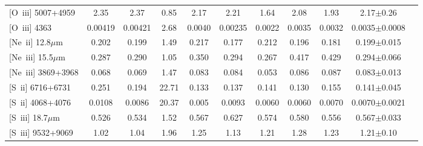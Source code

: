 \documentclass[twocolumn]{aastex62}
\begin{document}
\begin{CJK*}{UTF8}{gbsn}
\begin{table*}
\begin{center}
\begin{minipage}{13.5cm}
\begin{tabular}{@{}lcccccccccc}
{[O~\sc iii]} 5007+4959           & 2.35     & 2.37     &  0.85   & 2.17      & 2.21     & 1.64     & 2.08     & 1.93  & 2.17$\pm$0.26\\
{[O~\sc iii]} 4363                     & 0.00419 & 0.00421 &  2.68   & 0.0040 & 0.00235 & 0.0022 & 0.0035 & 0.0032  & 0.0035$\pm$0.0008\\
{[Ne~\sc ii]} 12.8$\mu$m        & 0.202   & 0.199    &  1.49   & 0.217    & 0.177   & 0.212   & 0.196   & 0.181 & 0.199$\pm$0.015 \\
{[Ne~\sc iii]} 15.5$\mu$m       & 0.287   & 0.290    &  1.05   & 0.350    & 0.294   & 0.267   & 0.417   & 0.429  & 0.294$\pm$0.066\\
{[Ne~\sc iii]} 3869+3968         & 0.068   & 0.069    &  1.47   & 0.083    & 0.084   & 0.053   & 0.086   & 0.087  & 0.083$\pm$0.013\\
{[S~\sc ii]} 6716+6731            & 0.251   & 0.194    &  22.71 & 0.133    & 0.137   & 0.141   & 0.130   & 0.155  &  0.141$\pm$0.045 \\
{[S~\sc ii]} 4068+4076            & 0.0108     & 0.0086    &  20.37  & 0.005    & 0.0093 & 0.0060 & 0.0060 & 0.0070 &  0.0070$\pm$0.0021 \\
{[S~\sc iii]} 18.7$\mu$m          & 0.526   & 0.534    &  1.52   & 0.567   & 0.627   & 0.574   & 0.580   & 0.556 &  0.567$\pm$0.033 \\
{[S~\sc iii]} 9532+9069            & 1.02     & 1.04      &  1.96   & 1.25      & 1.13     & 1.21     & 1.28     & 1.23  & 1.21$\pm$0.10\\
\hline
\end{tabular}
\end{minipage}
\end{center}
\end{table*}



\end{CJK*}
\end{document}
